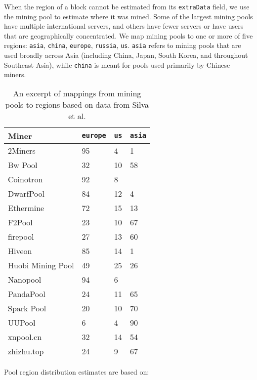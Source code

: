 \begin{appendices}
When the region of a block cannot be estimated from its \texttt{extraData} field, we use the mining pool to estimate where it was mined. Some of the largest mining pools have multiple international servers, and others have fewer servers or have users that are geographically concentrated. We map mining pools to one or more of five regions: \texttt{asia}, \texttt{china}, \texttt{europe}, \texttt{russia}, \texttt{us}. \texttt{asia} refers to mining pools that are used broadly across Asia (including China, Japan, South Korea, and throughout Southeast Asia), while \texttt{china} is meant for pools used primarily by Chinese miners.

\begin{table}[htp]
\centering
\begin{tabular}{@{}llll@{}}
\toprule
Miner & \texttt{europe} & \texttt{us} & \texttt{asia} \\ \midrule
2Miners & 95 & 4 & 1 \\
Bw Pool & 32 & 10 & 58 \\
Coinotron & 92 & 8 &  \\
DwarfPool & 84 & 12 & 4 \\
Ethermine & 72 & 15 & 13 \\
F2Pool & 23 & 10 & 67 \\
firepool & 27 & 13 & 60 \\
Hiveon & 85 & 14 & 1 \\
Huobi Mining Pool & 49 & 25 & 26 \\
Nanopool & 94 & 6 &  \\
PandaPool & 24 & 11 & 65 \\
Spark Pool & 20 & 10 & 70 \\
UUPool & 6 & 4 & 90 \\
xnpool.cn & 32 & 14 & 54 \\
zhizhu.top & 24 & 9 & 67 \\ \bottomrule
\end{tabular}
\caption{An excerpt of mappings from mining pools to regions based on data from Silva et al\cite{silva_impact_2020}.}
\label{tab:mining-pool-regions}
\end{table}

Pool region distribution estimates are based on:


\end{appendices}
